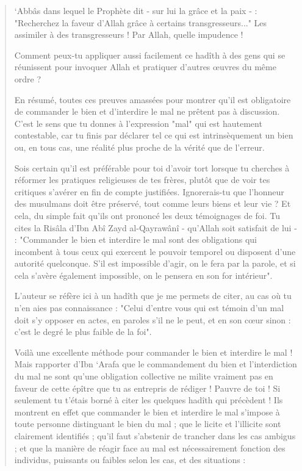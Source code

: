 \begin{quote}
`Abbâs dans lequel le Prophète dit - sur lui la grâce et la paix - :
"Recherchez la faveur d'Allah grâce à certains transgresseurs..." Les
assimiler à des transgresseurs ! Par Allah, quelle impudence !

Comment peux-tu appliquer aussi facilement ce hadîth à des gens qui se
réunissent pour invoquer Allah et pratiquer d'autres œuvres du même
ordre ?

En résumé, toutes ces preuves amassées pour montrer qu'il est
obligatoire de commander le bien et d'interdire le mal ne prêtent pas à
discussion. C'est le sens que tu donnes à l'expression "mal" qui est
hautement contestable, car tu finis par déclarer tel ce qui est
intrinsèquement un bien ou, en tous cas, une réalité plus proche de la
vérité que de l'erreur.

Sois certain qu'il est préférable pour toi d'avoir tort lorsque tu
cherches à réformer les pratiques religieuses de tes frères, plutôt que
de voir tes critiques s'avérer en fin de compte justifiées.
Ignorerais-tu que l'honneur des musulmans doit être préservé, tout comme
leurs biens et leur vie ? Et cela, du simple fait qu'ils ont prononcé
les deux témoignages de foi. Tu cites la Risâla d'Ibn Abî Zayd
al-Qayrawânî - qu'Allah soit satisfait de lui - : "Commander le bien et
interdire le mal sont des obligations qui incombent à tous ceux qui
exercent le pouvoir temporel ou disposent d'une autorité quelconque.
S'il est impossible d'agir, on le fera par la parole, et si cela s'avère
également impossible, on le pensera en son for intérieur".

L'auteur se réfère ici à un hadîth que je me permets de citer, au cas où
tu n'en aies pas connaissance : "Celui d'entre vous qui est témoin d'un
mal doit s'y opposer en actes, en paroles s'il ne le peut, et en son
cœur sinon : c'est le degré le plus faible de la foi".

Voilà une excellente méthode pour commander le bien et interdire le mal
! Mais rapporter d'Ibn `Arafa que le commandement du bien et
l'interdiction du mal ne sont qu'une obligation collective ne milite
vraiment pas en faveur de cette épître que tu as entrepris de rédiger !
Pauvre de toi ! Si seulement tu t'étais borné à citer les quelques
hadîth qui précèdent ! Ils montrent en effet que commander le bien et
interdire le mal s'impose à toute personne distinguant le bien du mal ;
que le licite et l'illicite sont clairement identifiés ; qu'il faut
s'abstenir de trancher dans les cas ambigus ; et que la manière de
réagir face au mal est nécessairement fonction des individus, puissants
ou faibles selon les cas, et des situations :


\end{quote}
